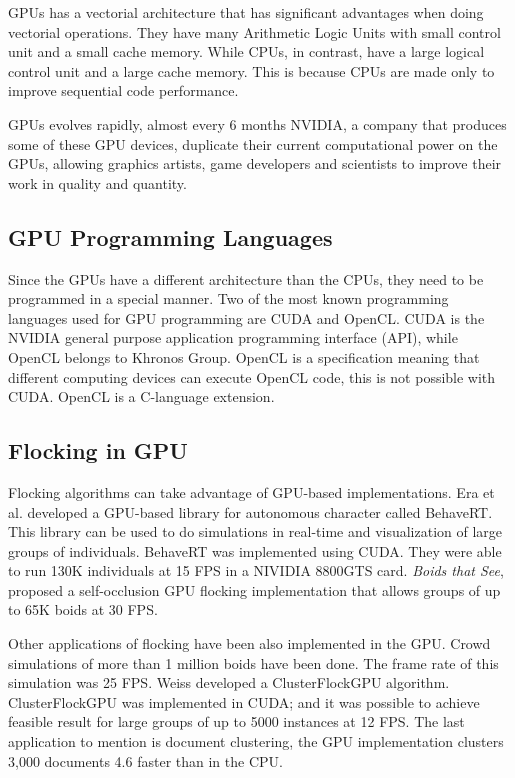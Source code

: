 GPUs has a vectorial architecture that has significant advantages when doing vectorial operations. They have many Arithmetic Logic Units with small control unit and a small cache memory. While CPUs, in contrast, have a large logical control unit and a large cache memory. This is because CPUs are made only to improve sequential code performance.

GPUs evolves rapidly, almost every 6 months NVIDIA\cite{nvidia}, a company that produces some of these GPU devices, duplicate their current computational power on the GPUs, allowing graphics artists, game developers and scientists to improve their work in quality and quantity. 

\subsection{GPU Programming Languages}
Since the GPUs have a different architecture than the CPUs, they need to be programmed in a special manner. Two of the most known programming languages used for GPU programming are CUDA and OpenCL. CUDA is the NVIDIA  general purpose application programming interface (API)\cite{CUDAandOpenCL}, while OpenCL belongs to Khronos Group. OpenCL is a specification meaning that different computing devices can execute OpenCL code, this is not possible with CUDA. OpenCL is a C-language extension.
 
\subsection{Flocking in GPU}\label{flockingGPU}
Flocking algorithms can take advantage of GPU-based implementations. Era et al. developed a GPU-based library for autonomous character called BehaveRT\cite{BehaveRT}. This library can be used to do simulations in real-time and visualization of large groups of individuals. BehaveRT was implemented using CUDA. They were able to run 130K individuals at 15 FPS in a NIVIDIA 8800GTS card. \textit{Boids that See}, proposed a self-occlusion GPU flocking implementation that allows groups of up to 65K boids at 30 FPS\cite{boidsThatSee}. 

Other applications of flocking have been also implemented in the GPU.  Crowd simulations of more than 1 million boids have been done\cite{supermassiveCrowd}. The frame rate of this simulation was 25 FPS. Weiss developed a ClusterFlockGPU algorithm\cite{SI_GPU}. ClusterFlockGPU was implemented in CUDA; and it was possible to achieve feasible result for large groups of up to 5000 instances at 12 FPS. The last application to mention is document clustering, the GPU implementation clusters 3,000 documents 4.6 faster than in the CPU\cite{document2}.


